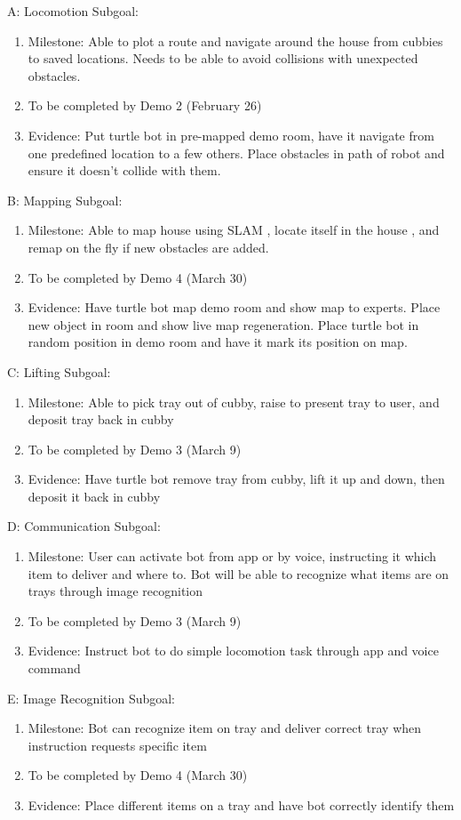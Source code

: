 \documentclass{article}
\begin{document}
A: Locomotion Subgoal:
\begin{enumerate}
\item Milestone: Able to plot a route and navigate around the house from cubbies to saved locations. Needs to be able to avoid collisions with unexpected obstacles.
\item To be completed by Demo 2 (February 26)
\item Evidence: Put turtle bot in pre-mapped demo room, have it navigate from one predefined location to a few others. Place obstacles in path of robot and ensure it doesn't collide with them.
\end{enumerate}
B: Mapping Subgoal:
\begin{enumerate}
\item Milestone: Able to map house using SLAM \cite{gmapping}, locate itself in the house \cite{amcl}, and remap on the fly if new obstacles are added.
\item To be completed by Demo 4 (March 30)
\item Evidence: Have turtle bot map demo room and show map to experts. Place new object in room and show live map regeneration. Place turtle bot in random position in demo room and have it mark its position on map.
\end{enumerate}
C: Lifting Subgoal:
\begin{enumerate}
\item Milestone: Able to pick tray out of cubby, raise to present tray to user, and deposit tray back in cubby
\item To be completed by Demo 3 (March 9)
\item Evidence: Have turtle bot remove tray from cubby, lift it up and down, then deposit it back in cubby
\end{enumerate}
D: Communication Subgoal:
\begin{enumerate}
\item Milestone: User can activate bot from app or by voice, instructing it which item to deliver and where to. Bot will be able to recognize what items are on trays through image recognition
\item To be completed by Demo 3 (March 9)
\item Evidence: Instruct bot to do simple locomotion task through app and voice command
\end{enumerate}
E: Image Recognition Subgoal:
\begin{enumerate}
\item Milestone: Bot can recognize item on tray and deliver correct tray when instruction requests specific item
\item To be completed by Demo 4 (March 30)
\item Evidence: Place different items on a tray and have bot correctly identify them
\end{enumerate}
\end{document}
